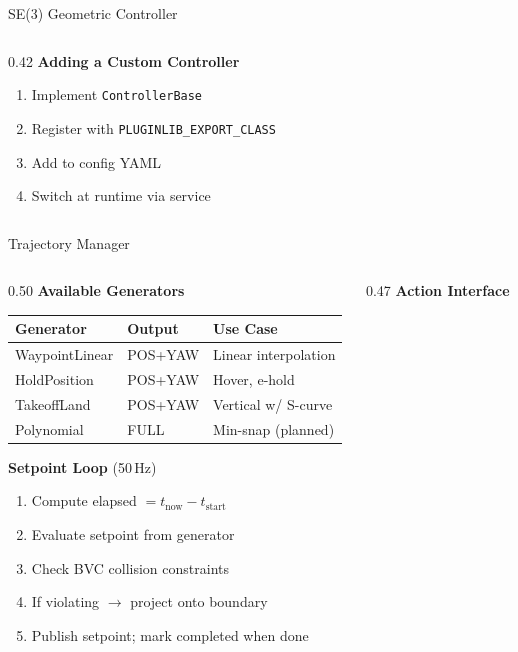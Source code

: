 \documentclass[aspectratio=169, 10pt]{beamer}
\begin{document}
\begin{frame}{SE(3) Geometric Controller}
\begin{columns}[T]
\begin{column}{0.42\textwidth}
\vspace{0.5em}
\textbf{Adding a Custom Controller}
\begin{enumerate}\scriptsize
  \item Implement \texttt{ControllerBase}
  \item Register with \texttt{PLUGINLIB\_EXPORT\_CLASS}
  \item Add to config YAML
  \item Switch at runtime via service
\end{enumerate}
\end{column}
\end{columns}
\end{frame}

\begin{frame}{Trajectory Manager}
\begin{columns}[T]
\begin{column}{0.50\textwidth}
\textbf{Available Generators}

\vspace{0.2em}
\scriptsize
\begin{tabular}{@{}llp{2.2cm}@{}}
\toprule
\textbf{Generator} & \textbf{Output} & \textbf{Use Case} \\
\midrule
WaypointLinear & POS+YAW & Linear interpolation \\
HoldPosition & POS+YAW & Hover, e-hold \\
TakeoffLand & POS+YAW & Vertical w/ S-curve \\
Polynomial & FULL & Min-snap (planned) \\
\bottomrule
\end{tabular}

\vspace{0.3em}
\small\textbf{Setpoint Loop} (50\,Hz)
\begin{enumerate}\scriptsize
  \item Compute elapsed $= t_{\text{now}} - t_{\text{start}}$
  \item Evaluate setpoint from generator
  \item Check BVC collision constraints
  \item If violating $\to$ project onto boundary
  \item Publish setpoint; mark completed when done
\end{enumerate}
\end{column}
\begin{column}{0.47\textwidth}
\textbf{Action Interface}


\end{column}
\end{columns}
\end{frame}
\end{document}
